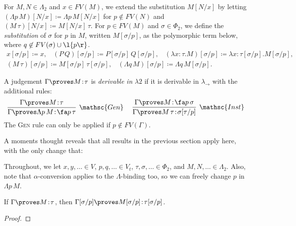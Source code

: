 \documentclass[reqno]{amsart}
\begin{document}
    \begin{definition}
        For $M,N\in\Lambda_2$ and $x\in FV(M)$, we extend the substitution $M[N/x]$ by letting $(\Lambda p\,M)[N/x]\coloneqq\Lambda p\,M[N/x]$ for $p\not\in FV(N)$ and $(M\,\tau)[N/x]\coloneqq M[N/x]\,\tau$. For $p\in FV(M)$ and $\sigma\in\Phi_2$, we define the \textit{substitution} of $\sigma$ for $p$ in $M$, written $M[\sigma/p]$, as the polymorphic term below, where $q\not\in FV(\sigma)\cup\l\{p\r\}$.
        \begin{equation*}
            \begin{gathered}
                x[\sigma/p]\coloneqq x,\ \ \ \ (P\,Q)[\sigma/p]\coloneqq P[\sigma/p]\,Q[\sigma/p],\ \ \ \ (\lambda x\!:\!\tau.M)[\sigma/p]\coloneqq\lambda x\!:\!{\tau[\sigma/p]}.M[\sigma/p],\\
                (M\,\tau)[\sigma/p]\coloneqq M[\sigma/p]\,\tau[\sigma/p],\ \ \ \ (\Lambda q\,M)[\sigma/p]\coloneqq\Lambda q\,M[\sigma/p].
            \end{gathered}
        \end{equation*}
    \end{definition}

    \begin{definition}
        A judgement $\Gamma\proves M\!:\!\tau$ is \textit{derivable in $\lambda2$} if it is derivable in $\lambda_\rightarrow$ with the additional rules:
        \begin{equation*}
            \infer[\mathsc{Gen}]{\Gamma\proves\Lambda p\,M\!:\!\fa p\,\tau}{\Gamma\proves M\!:\!\tau}\ \ \ \ 
            \infer[\mathsc{Inst}]{\Gamma\proves M\,\tau\!:\!\sigma[\tau/p]}{\Gamma\proves M\!:\!\fa p\,\sigma}
        \end{equation*}
        The \textsc{Gen} rule can only be applied if $p\not\in FV(\Gamma)$.
    \end{definition}

    A moments thought reveals that all results in the previous section apply here, with the only change that:

    \begin{notation}
        Throughout, we let $x,y,\ldots\in V$, $p,q,\ldots\in V_t$, $\tau,\sigma,\ldots\in\Phi_2$, and $M,N,\ldots\in\Lambda_2$. Also, note that $\alpha$-conversion applies to the $\Lambda$-binding too, so we can freely change $p$ in $\Lambda p\,M$.
    \end{notation}

    \begin{lemma}\label{lem:polymorphic_variable_substitution}
        If $\Gamma\proves M\!:\!\tau$, then $\Gamma[\sigma/p]\proves M[\sigma/p]\!:\!\tau[\sigma/p]$.
    \end{lemma}
    \begin{proof}
        \TODO
    \end{proof}
\end{document}
